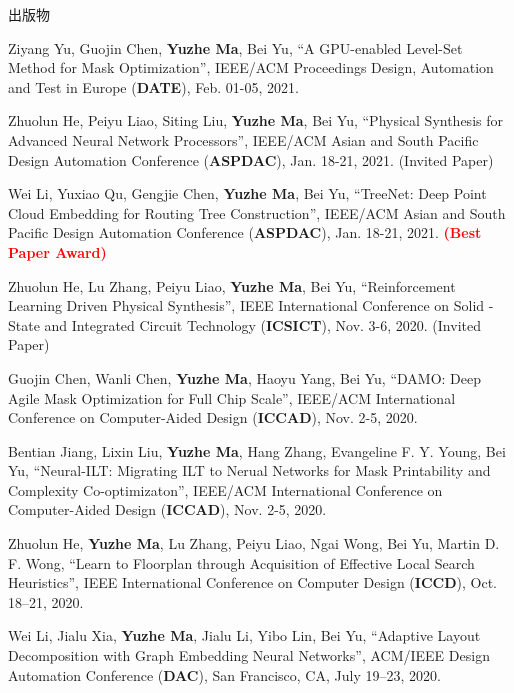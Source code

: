 \begin{rSection}{出版物}
\begin{description}[font=\normalfont]
\item [{[C22]}]{
    Ziyang Yu, Guojin Chen, \textbf{Yuzhe Ma}, Bei Yu,
    ``A GPU-enabled Level-Set Method for Mask Optimization'',
    IEEE/ACM Proceedings Design, Automation and Test in Europe (\textbf{DATE}), Feb. 01-05, 2021.
}

\item [{[C21]}]{
    Zhuolun He, Peiyu Liao, Siting Liu, \textbf{Yuzhe Ma}, Bei Yu,
    ``Physical Synthesis for Advanced Neural Network Processors'',
    IEEE/ACM Asian and South Pacific Design Automation Conference (\textbf{ASPDAC}), Jan. 18-21, 2021. (Invited Paper)
}

\item [{[C20]}]{
    Wei Li, Yuxiao Qu, Gengjie Chen, \textbf{Yuzhe Ma}, Bei Yu,
    ``TreeNet: Deep Point Cloud Embedding for Routing Tree Construction'',
    IEEE/ACM Asian and South Pacific Design Automation Conference (\textbf{ASPDAC}), Jan. 18-21, 2021.
    \textcolor{red}{\textbf{(Best Paper Award)}}
}

\item[{[C19]}]{
    Zhuolun He, Lu Zhang, Peiyu Liao, \textbf{Yuzhe Ma}, Bei Yu,
    ``Reinforcement Learning Driven Physical Synthesis'',
    IEEE International Conference on Solid -State and Integrated Circuit Technology (\textbf{ICSICT}), Nov. 3-6, 2020. (Invited Paper)
}

\item[{[C18]}]{
    Guojin Chen, Wanli Chen, \textbf{Yuzhe Ma}, Haoyu Yang, Bei Yu,
    ``DAMO: Deep Agile Mask Optimization for Full Chip Scale'',
    IEEE/ACM International Conference on Computer-Aided Design (\textbf{ICCAD}), Nov. 2-5, 2020.
}

\item[{[C17]}]{
    Bentian Jiang, Lixin Liu, \textbf{Yuzhe Ma}, Hang Zhang, Evangeline F. Y. Young, Bei Yu,
    ``Neural-ILT: Migrating ILT to Nerual Networks for Mask Printability and Complexity Co-optimizaton'',
    IEEE/ACM International Conference on Computer-Aided Design (\textbf{ICCAD}), Nov. 2-5, 2020.
}

\item[{[C16]}]{
    Zhuolun He, \textbf{Yuzhe Ma}, Lu Zhang, Peiyu Liao, Ngai Wong, Bei Yu, Martin D. F. Wong,
    ``Learn to Floorplan through Acquisition of Effective Local Search Heuristics'',
    IEEE International Conference on Computer Design (\textbf{ICCD}), Oct. 18–21, 2020.
}

\item[{[C15]}]{
    Wei Li, Jialu Xia, \textbf{Yuzhe Ma}, Jialu Li, Yibo Lin, Bei Yu,
    ``Adaptive Layout Decomposition with Graph Embedding Neural Networks'',
    ACM/IEEE Design Automation Conference (\textbf{DAC}), San Francisco, CA, July 19–23, 2020.
}


\end{description}
\end{rSection}
